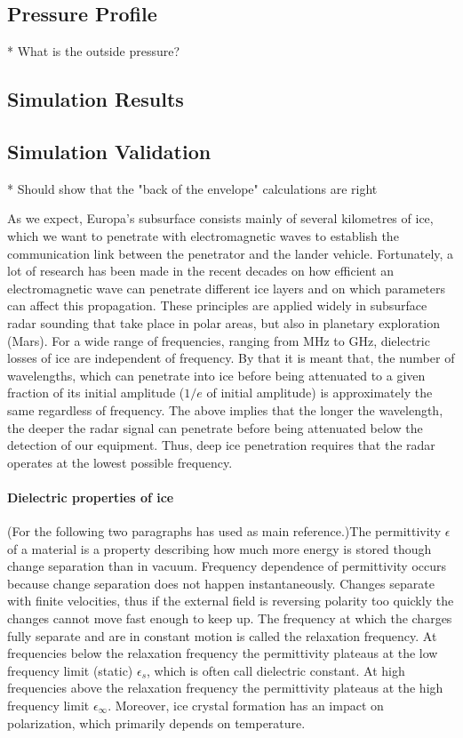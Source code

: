 \subsection{Pressure Profile}

* What is the outside pressure?

\subsection{Simulation Results}

\subsection{Simulation Validation}

* Should show that the "back of the envelope" calculations are right

\label{sec:ice_losses}

As we expect, Europa's subsurface consists mainly of several kilometres of ice, which we want to penetrate with electromagnetic waves to establish the communication link between the penetrator and the lander vehicle. Fortunately, a lot of research has been made in the recent decades on how efficient an electromagnetic wave can penetrate different ice layers and on which parameters can affect this propagation. These principles are applied widely in subsurface radar sounding that take place in polar areas, but also in planetary exploration (Mars). For a wide range of frequencies, ranging from MHz to GHz, dielectric losses of ice are independent of frequency. By that it is meant that, the number of wavelengths, which can penetrate into ice before being attenuated to a given fraction of its initial amplitude ($1/e$ of initial amplitude) is approximately the same regardless of frequency. The above implies that the longer the wavelength, the deeper the radar signal can penetrate before being attenuated below the detection of our equipment. Thus, deep ice penetration requires that the radar operates at the lowest possible frequency. 

\paragraph{Dielectric properties of ice}
(For the following two paragraphs \cite{Kofman_2010} has used as main reference.)The permittivity $\epsilon$ of a material is a property describing how much more energy is stored though change separation than in vacuum. Frequency dependence of permittivity occurs because change separation does not happen instantaneously. Changes separate with finite velocities, thus if the external field is reversing polarity too quickly the changes cannot move fast enough to keep up. The frequency at which the charges fully separate and are in constant motion is called the relaxation frequency. At frequencies below the relaxation frequency the permittivity plateaus at the low frequency limit (static) $\epsilon_{s}$, which is often call dielectric constant. At high frequencies above the relaxation frequency the permittivity plateaus at the high frequency limit $\epsilon_{\infty}$. Moreover, ice crystal formation has an impact on polarization, which primarily depends on temperature.

